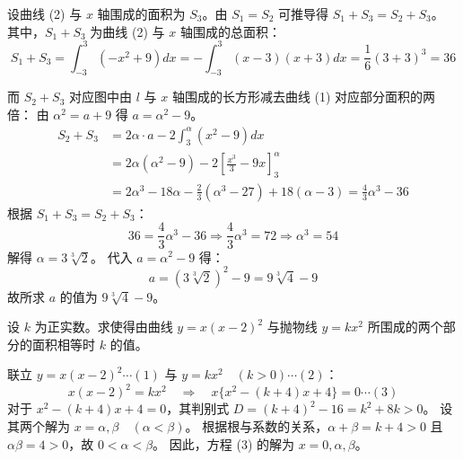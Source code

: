 \begin{questions}
\begin{solution}
    设曲线 (2) 与 $x$ 轴围成的面积为 $S_3$。由 $S_1 = S_2$ 可推导得 $S_1 + S_3 = S_2 + S_3$。
    其中，$S_1 + S_3$ 为曲线 (2) 与 $x$ 轴围成的总面积：
    \[ S_1 + S_3 = \int_{-3}^{3} (-x^2 + 9)dx = -\int_{-3}^{3} (x-3)(x+3)dx = \frac{1}{6}(3+3)^3 = 36  \]
    
    而 $S_2 + S_3$ 对应图中由 $l$ 与 $x$ 轴围成的长方形减去曲线 (1) 对应部分面积的两倍：
    由 $\alpha^2 = a+9$ 得 $a = \alpha^2 - 9$。
    \begin{align*}
        S_2 + S_3 &= 2\alpha \cdot a - 2\int_{3}^{\alpha} (x^2 - 9)dx \\
        &= 2\alpha(\alpha^2 - 9) - 2\left[ \frac{x^3}{3} - 9x \right]_{3}^{\alpha} \\
        &= 2\alpha^3 - 18\alpha - \frac{2}{3}(\alpha^3 - 27) + 18(\alpha - 3) = \frac{4}{3}\alpha^3 - 36 
    \end{align*}
    根据 $S_1 + S_3 = S_2 + S_3$：
    \[ 36 = \frac{4}{3}\alpha^3 - 36 \Rightarrow \frac{4}{3}\alpha^3 = 72 \Rightarrow \alpha^3 = 54  \]
    解得 $\alpha = 3\sqrt[3]{2}$。
    代入 $a = \alpha^2 - 9$ 得：
    \[ a = (3\sqrt[3]{2})^2 - 9 = 9\sqrt[3]{4} - 9  \]
    故所求 $a$ 的值为 $9\sqrt[3]{4} - 9$。
\end{solution}

\question
设 $k$ 为正实数。求使得由曲线 $y = x(x-2)^2$ 与抛物线 $y = kx^2$ 所围成的两个部分的面积相等时 $k$ 的值。

\begin{solution}
    联立 $y = x(x-2)^2 \cdots (1)$ 与 $y = kx^2 \quad (k>0) \cdots (2)$：
    \[ x(x-2)^2 = kx^2 \quad \Rightarrow \quad x\{x^2 - (k+4)x + 4\} = 0 \cdots (3) \]
    对于 $x^2 - (k+4)x + 4 = 0$，其判别式 $D = (k+4)^2 - 16 = k^2 + 8k > 0$。
    设其两个解为 $x = \alpha, \beta \quad (\alpha < \beta)$。
    根据根与系数的关系，$\alpha + \beta = k+4 > 0$ 且 $\alpha\beta = 4 > 0$，故 $0 < \alpha < \beta$。
    因此，方程 (3) 的解为 $x = 0, \alpha, \beta$。


\end{solution}
\end{questions}
